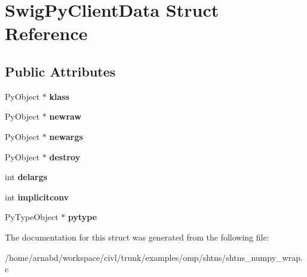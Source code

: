\hypertarget{structSwigPyClientData}{}\section{Swig\+Py\+Client\+Data Struct Reference}
\label{structSwigPyClientData}
\subsection*{Public Attributes}
\begin{DoxyCompactItemize}
\item 
\hypertarget{structSwigPyClientData_a482d64908147c310a56d1541476079dc}{}Py\+Object $\ast$ {\bfseries klass}\label{structSwigPyClientData_a482d64908147c310a56d1541476079dc}

\item 
\hypertarget{structSwigPyClientData_a4da9e7723a1319cb42cda4ad186f65a3}{}Py\+Object $\ast$ {\bfseries newraw}\label{structSwigPyClientData_a4da9e7723a1319cb42cda4ad186f65a3}

\item 
\hypertarget{structSwigPyClientData_a8f6dacca2c445f175d622fb9264e3715}{}Py\+Object $\ast$ {\bfseries newargs}\label{structSwigPyClientData_a8f6dacca2c445f175d622fb9264e3715}

\item 
\hypertarget{structSwigPyClientData_a1c4e62712f23db599e85e24e14818d59}{}Py\+Object $\ast$ {\bfseries destroy}\label{structSwigPyClientData_a1c4e62712f23db599e85e24e14818d59}

\item 
\hypertarget{structSwigPyClientData_a9cb4b9b02743d09dbe216f304e2b7df0}{}int {\bfseries delargs}\label{structSwigPyClientData_a9cb4b9b02743d09dbe216f304e2b7df0}

\item 
\hypertarget{structSwigPyClientData_a5f9ebdbc04a774559a64b926b6ec4070}{}int {\bfseries implicitconv}\label{structSwigPyClientData_a5f9ebdbc04a774559a64b926b6ec4070}

\item 
\hypertarget{structSwigPyClientData_a1f172e51bb27f670dacdf8247843b4c2}{}Py\+Type\+Object $\ast$ {\bfseries pytype}\label{structSwigPyClientData_a1f172e51bb27f670dacdf8247843b4c2}

\end{DoxyCompactItemize}


The documentation for this struct was generated from the following file\+:\begin{DoxyCompactItemize}
\item 
/home/arnabd/workspace/civl/trunk/examples/omp/shtns/shtns\+\_\+numpy\+\_\+wrap.\+c\end{DoxyCompactItemize}
